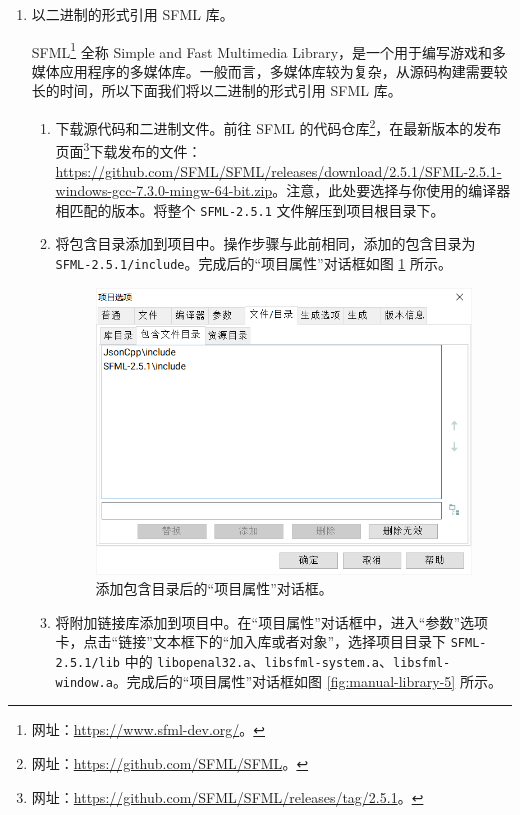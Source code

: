 \begin{enumerate}
	\item 以二进制的形式引用 SFML 库。\label{item:exp-2-3}

	SFML\footnote{网址：\url{https://www.sfml-dev.org/}。} 全称 Simple and Fast Multimedia Library，是一个用于编写游戏和多媒体应用程序的多媒体库。一般而言，多媒体库较为复杂，从源码构建需要较长的时间，所以下面我们将以二进制的形式引用 SFML 库。

	\begin{enumerate}
		\item 下载源代码和二进制文件。前往 SFML 的代码仓库\footnote{网址：\url{https://github.com/SFML/SFML}。}，在最新版本的发布页面\footnote{网址：\url{https://github.com/SFML/SFML/releases/tag/2.5.1}。}下载发布的文件：\url{https://github.com/SFML/SFML/releases/download/2.5.1/SFML-2.5.1-windows-gcc-7.3.0-mingw-64-bit.zip}。注意，此处要选择与你使用的编译器相匹配的版本。将整个 \lstinline[language={}]{SFML-2.5.1} 文件解压到项目根目录下。

		\item 将包含目录添加到项目中。操作步骤与此前相同，添加的包含目录为 \lstinline[language={}]{SFML-2.5.1/include}。完成后的“项目属性”对话框如图 \ref{fig:manual-library-4} 所示。

		\begin{figure}
			\centering
			\includegraphics[width=0.75\linewidth]{assets/manual-library-4}
			\caption{添加包含目录后的“项目属性”对话框。}
			\label{fig:manual-library-4}
		\end{figure}

		\item 将附加链接库添加到项目中。\label{item:exp-2-3-3}在“项目属性”对话框中，进入“参数”选项卡，点击“链接”文本框下的“加入库或者对象”，选择项目目录下 \lstinline[language={}]{SFML-2.5.1/lib} 中的 \lstinline[language={}]{libopenal32.a}、\lstinline[language={}]{libsfml-system.a}、\lstinline[language={}]{libsfml-window.a}。完成后的“项目属性”对话框如图 \ref{fig:manual-library-5} 所示。


\end{enumerate}
\end{enumerate}
